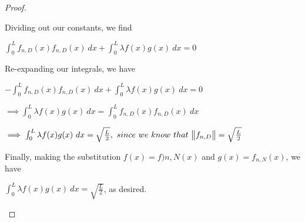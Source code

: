 \documentclass[executivepaper]{article}
\begin{document}
\begin{flushleft}
\begin{proof}
\begin{center}
\end{center}

Dividing out our constants, we find

\begin{center}

$\int_{0}^{L} f_{n,D}(x) f_{n, D}(x) \ dx +  \int_{0}^{L} \lambda f(x)g(x) \ dx=0$

\end{center}

Re-expanding our integrals, we have

\begin{center}

$-\int_{0}^{L} f_{n,D}(x) f_{n, D}(x) \ dx + \int_{0}^{L} \lambda f(x)g(x) \ dx=0$

\vspace{2mm}

$\implies \int_{0}^{L} \lambda f(x)g(x) \ dx=\int_{0}^{L} f_{n,D}(x) f_{n, D}(x) \ dx$

\vspace{2mm}

$\implies \int_{0}^{L} \lambda f(x)g(x) \ dx=\sqrt{\frac{L}{2}},  ~ since ~ we ~ know ~ that ~ \norm{f_{n,D}}=\sqrt{\frac{L}{2}} $

\end{center}

Finally, making the substitution $f(x)=f){n, N}(x)$ and $g(x)=f_{n, N}(x)$, we have

\begin{center}

$\int_{0}^{L} \lambda f(x)g(x) \ dx=\sqrt{\frac{L}{2}}$, as desired.

\end{center}

\end{proof}

\end{flushleft}
\end{document}
